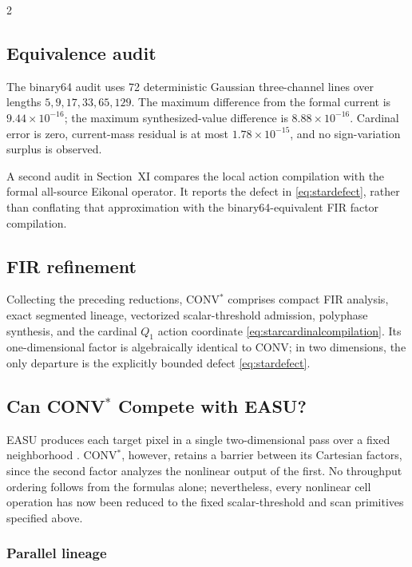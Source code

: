 \begin{multicols}{2}
\subsection{Equivalence audit}

The binary64 audit uses 72 deterministic Gaussian three-channel lines over
lengths \(5,9,17,33,65,129\). The maximum difference from the formal current
is \(9.44\times10^{-16}\); the maximum synthesized-value difference is
\(8.88\times10^{-16}\). Cardinal error is zero, current-mass residual is at
most \(1.78\times10^{-15}\), and no sign-variation surplus is observed.

A second audit in Section~XI compares the local action compilation with the
formal all-source Eikonal operator. It reports the defect in
\eqref{eq:stardefect}, rather than conflating that approximation with the
binary64-equivalent FIR factor compilation.

\subsection{FIR refinement}

Collecting the preceding reductions, CONV$^{*}$ comprises compact FIR
analysis, exact segmented lineage, vectorized scalar-threshold admission,
polyphase synthesis, and the cardinal \(Q_1\) action coordinate
\eqref{eq:starcardinalcompilation}. Its one-dimensional factor is
algebraically identical to CONV; in two dimensions, the only departure is the
explicitly bounded defect \eqref{eq:stardefect}.

\subsection{Can CONV\texorpdfstring{$^{*}$}{*} Compete with EASU?}

EASU produces each target pixel in a single two-dimensional pass over a fixed
neighborhood \cite{lottes2021}. CONV$^{*}$, however, retains a barrier between
its Cartesian factors, since the second factor analyzes the nonlinear output
of the first. No throughput ordering follows from the formulas alone;
nevertheless, every nonlinear cell operation has now been reduced to the
fixed scalar-threshold and scan primitives specified above.

\subsubsection{Parallel lineage}


\end{multicols}

